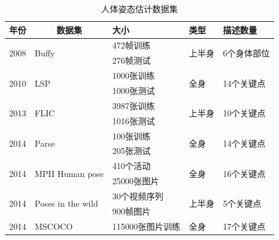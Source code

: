 \documentclass[hyperref]{ctexart}
\begin{document}
\begin{table}[H]
	\centering
	\caption{人体姿态估计数据集}
	\begin{tabular}{lllll}
		\hline
		年份                                        & \multicolumn{1}{c}{数据集}            & 大小              & 类型                   & 描述数量                    \\ \hline
		\multicolumn{1}{c}{\multirow{2}{*}{2008}} & \multirow{2}{*}{Buffy}             & 472帧训练          & \multirow{2}{*}{上半身} & \multirow{2}{*}{6个身体部位} \\
		\multicolumn{1}{c}{}                      &                                    & 276帧测试          &                      &                         \\ \hline
		\multirow{2}{*}{2010}                     & \multirow{2}{*}{LSP}               & 1000张训练         & \multirow{2}{*}{全身}  & \multirow{2}{*}{14个关键点} \\
		&                                    & 1000张测试         &                      &                         \\ \hline
		\multirow{2}{*}{2013}                     & \multirow{2}{*}{FLIC}              & 3987张训练         & \multirow{2}{*}{上半身} & \multirow{2}{*}{10个关键点} \\
		&                                    & 1016张测试         &                      &                         \\ \hline
		\multirow{2}{*}{2014}                     & \multirow{2}{*}{Parse}             & 100张训练          & \multirow{2}{*}{全身}  & \multirow{2}{*}{14个关键点} \\
		&                                    & 205张测试          &                      &                         \\ \hline
		\multirow{2}{*}{2014}                     & \multirow{2}{*}{MPII Human pose}   & 410个活动          & \multirow{2}{*}{全身}  & \multirow{2}{*}{16个关键点} \\
		&                                    & 25000张图片        &                      &                         \\ \hline
		\multirow{2}{*}{2014}                     & \multirow{2}{*}{Poses in the wild} & 30个视频序列         & \multirow{2}{*}{上半身} & \multirow{2}{*}{5个关键点}  \\
		&                                    & 900帧图片          &                      &                         \\ \hline
		\multirow{3}{*}{2014}                     & \multirow{3}{*}{MSCOCO}            & 115000张图片训练     & \multirow{3}{*}{全身}  & \multirow{3}{*}{17个关键点} \\

\end{tabular}
\end{table}
\end{document}
